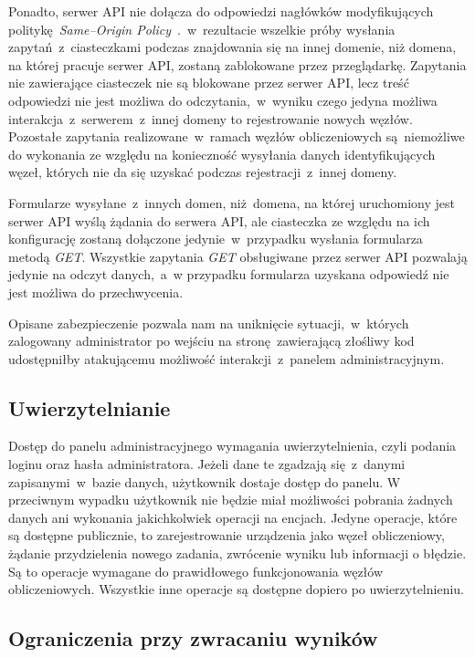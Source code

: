 \documentclass[a4paper,11pt,twoside]{report}
\theoremstyle{definition}
\begin{document}
Ponadto, serwer API nie dołącza do odpowiedzi nagłówków modyfikujących politykę \textit{Same--Origin Policy}~\cite{same-origin-policy}.~w~rezultacie wszelkie próby wysłania zapytań~z~ciasteczkami podczas znajdowania się na innej domenie, niż domena, na której pracuje serwer API, zostaną zablokowane przez przeglądarkę. 
Zapytania nie zawierające ciasteczek nie są blokowane przez serwer API, lecz treść odpowiedzi nie jest możliwa do odczytania,~w~wyniku czego jedyna możliwa interakcja~z~serwerem~z~innej domeny to rejestrowanie nowych węzłów.
Pozostałe zapytania realizowane~w~ramach węzłów obliczeniowych są niemożliwe do wykonania ze względu na konieczność wysyłania danych identyfikujących węzeł, których nie da się uzyskać podczas rejestracji~z~innej domeny.


Formularze wysyłane~z~innych domen, niż domena, na której uruchomiony jest serwer API wyślą żądania do serwera API, ale ciasteczka ze względu na ich konfigurację zostaną dołączone jedynie~w~przypadku wysłania formularza metodą \textit{GET}.
Wszystkie zapytania \textit{GET} obsługiwane przez serwer API pozwalają jedynie na odczyt danych,~a~w przypadku formularza uzyskana odpowiedź nie jest możliwa do przechwycenia.

Opisane zabezpieczenie pozwala nam na uniknięcie sytuacji,~w~których zalogowany administrator po wejściu na stronę zawierającą złośliwy kod udostępniłby atakującemu możliwość interakcji~z~panelem administracyjnym.

\subsection{Uwierzytelnianie} 

Dostęp do panelu administracyjnego wymagania uwierzytelnienia, czyli podania loginu oraz hasła administratora.
Jeżeli dane te zgadzają się~z~danymi zapisanymi~w~bazie danych, użytkownik dostaje dostęp do panelu.
W przeciwnym wypadku użytkownik nie będzie miał możliwości pobrania żadnych danych ani wykonania jakichkolwiek operacji na encjach.
Jedyne operacje, które są dostępne publicznie, to zarejestrowanie urządzenia jako węzeł obliczeniowy, żądanie przydzielenia nowego zadania, zwrócenie wyniku lub informacji o błędzie.
Są to operacje wymagane do prawidłowego funkcjonowania węzłów obliczeniowych. Wszystkie inne operacje są dostępne dopiero po uwierzytelnieniu.

\subsection{Ograniczenia przy zwracaniu wyników}
\end{document}
